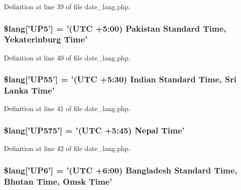Definition at line 39 of file date\-\_\-lang.\-php.

\hypertarget{date__lang_8php_a08236ffa5ff4db9f2bc023f5256fead1}{
\subsubsection[{\$lang}]{\setlength{\rightskip}{0pt plus 5cm}\$lang\mbox{[}'U\-P5'\mbox{]} = '(U\-T\-C +5\-:00) Pakistan Standard Time, Yekaterinburg Time'}}\label{date__lang_8php_a08236ffa5ff4db9f2bc023f5256fead1}


Definition at line 40 of file date\-\_\-lang.\-php.

\hypertarget{date__lang_8php_aa55a1ebecdfbd5e0c7e40c921b90cad2}{
\subsubsection[{\$lang}]{\setlength{\rightskip}{0pt plus 5cm}\$lang\mbox{[}'U\-P55'\mbox{]} = '(U\-T\-C +5\-:30) Indian Standard Time, Sri Lanka Time'}}\label{date__lang_8php_aa55a1ebecdfbd5e0c7e40c921b90cad2}


Definition at line 41 of file date\-\_\-lang.\-php.

\hypertarget{date__lang_8php_abc4186fc3bc853aa036b5b11eeb52ecd}{
\subsubsection[{\$lang}]{\setlength{\rightskip}{0pt plus 5cm}\$lang\mbox{[}'U\-P575'\mbox{]} = '(U\-T\-C +5\-:45) Nepal Time'}}\label{date__lang_8php_abc4186fc3bc853aa036b5b11eeb52ecd}


Definition at line 42 of file date\-\_\-lang.\-php.

\hypertarget{date__lang_8php_aaa655de76a3be875d9cedbf4a57244fa}{
\subsubsection[{\$lang}]{\setlength{\rightskip}{0pt plus 5cm}\$lang\mbox{[}'U\-P6'\mbox{]} = '(U\-T\-C +6\-:00) Bangladesh Standard Time, Bhutan Time, Omsk Time'}}\label{date__lang_8php_aaa655de76a3be875d9cedbf4a57244fa}


